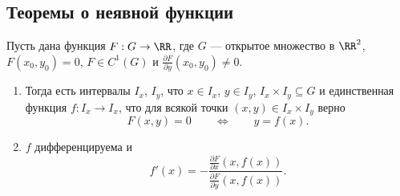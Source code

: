 \documentclass[12pt,a4paper]{article}
\begin{document}
    \subsection{Теоремы о неявной функции}

    \begin{theorem}
        Пусть дана функция $F: G \to \RR$, где $G$ --- открытое множество в $\RR^2$, $F(x_0, y_0) = 0$, $F \in C^1(G)$ и $\frac{\partial F}{\partial y}(x_0, y_0) \neq 0$.
        \begin{enumerate}
            \item Тогда есть интервалы $I_x$, $I_y$, что $x \in I_x$, $y \in I_y$, $I_x \times I_y \subseteq G$ и единственная функция $f: I_x \to I_x$, что для всякой точки $(x, y) \in I_x \times I_y$ верно
                \[F(x, y) = 0 \qquad \Longleftrightarrow \qquad y = f(x).\]
            \item $f$ дифференцируема и
                \[f'(x) = - \frac{\frac{\partial F}{\partial x}(x, f(x))}{\frac{\partial F}{\partial y}(x, f(x))}.\]
        \end{enumerate}
    \end{theorem}
\end{document}

